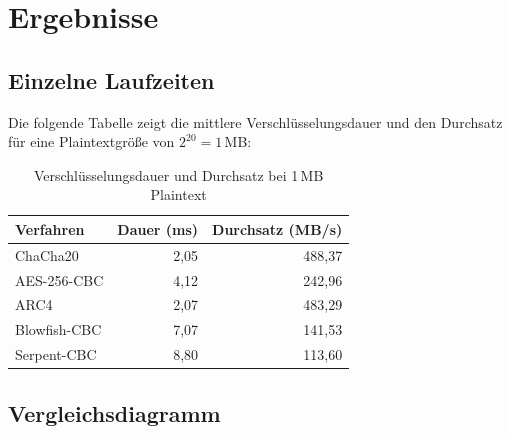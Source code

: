 \documentclass[
    fontsize=12pt,          %
    paper=a4,               %
    numbers=noenddot,       %
    listof=totoc,           %
    listof=entryprefix,     %
    listof=nochaptergap,    %
    bibliography=totoc,     %
    parskip=half,           %
    openany                 %
]{scrbook}
\begin{document}
\section*{Ergebnisse}

\subsection*{Einzelne Laufzeiten}

Die folgende Tabelle zeigt die mittlere Verschlüsselungsdauer und den Durchsatz für eine Plaintextgröße von $2^{20} = 1$\,MB:

\begin{table}[H]
    \centering
    \begin{tabular}{l r r}
        \toprule
        \textbf{Verfahren} & \textbf{Dauer (ms)} & \textbf{Durchsatz (MB/s)} \\
        \midrule
        ChaCha20     & 2{,}05  & 488{,}37 \\
        AES-256-CBC  & 4{,}12  & 242{,}96 \\
        ARC4         & 2{,}07  & 483{,}29 \\
        Blowfish-CBC & 7{,}07  & 141{,}53 \\
        Serpent-CBC  & 8{,}80  & 113{,}60 \\
        \bottomrule
    \end{tabular}
    \caption{Verschlüsselungsdauer und Durchsatz bei 1\,MB Plaintext}
\end{table}


\subsection*{Vergleichsdiagramm}
\end{document}
